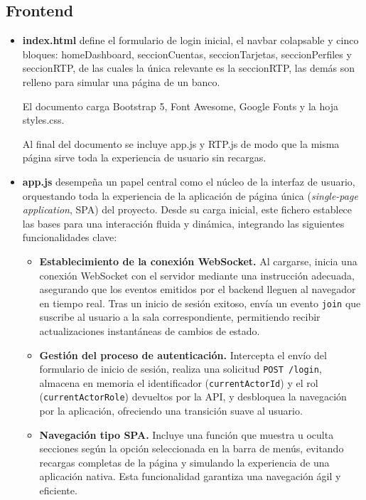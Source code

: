 \subsection{Frontend}
\label{subsubsec:Frontend}

\begin{itemize}
    \item \textbf{index.html} define el formulario de login inicial, el navbar colapsable y cinco bloques: homeDashboard, seccionCuentas, seccionTarjetas, seccionPerfiles y seccionRTP, de las cuales la única relevante es la seccionRTP, las demás son relleno para simular una página de un banco.
        
    El documento carga Bootstrap 5, Font Awesome, Google Fonts y la hoja styles.css.

    Al final del documento se incluye app.js y RTP.js de modo que la misma página sirve toda la experiencia de usuario sin recargas.
    \item \textbf{app.js} desempeña un papel central como el núcleo de la interfaz de usuario, orquestando toda la experiencia de la aplicación de página única (\textit{single-page application}, SPA) del proyecto. Desde su carga inicial, este fichero establece las bases para una interacción fluida y dinámica, integrando las siguientes funcionalidades clave:
        \begin{itemize}
            \item \textbf{Establecimiento de la conexión WebSocket.} Al cargarse, inicia una conexión WebSocket con el servidor mediante una instrucción adecuada, asegurando que los eventos emitidos por el backend lleguen al navegador en tiempo real. Tras un inicio de sesión exitoso, envía un evento \texttt{join} que suscribe al usuario a la sala correspondiente, permitiendo recibir actualizaciones instantáneas de cambios de estado.

            \item \textbf{Gestión del proceso de autenticación.} Intercepta el envío del formulario de inicio de sesión, realiza una solicitud \texttt{POST /login}, almacena en memoria el identificador (\texttt{currentActorId}) y el rol (\texttt{currentActorRole}) devueltos por la API, y desbloquea la navegación por la aplicación, ofreciendo una transición suave al usuario.

            \item \textbf{Navegación tipo SPA.} Incluye una función que muestra u oculta secciones según la opción seleccionada en la barra de menús, evitando recargas completas de la página y simulando la experiencia de una aplicación nativa. Esta funcionalidad garantiza una navegación ágil y eficiente.


\end{itemize}
\end{itemize}
